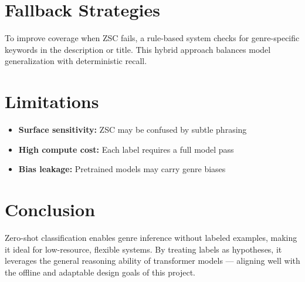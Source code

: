 \section{Fallback Strategies}
To improve coverage when ZSC fails, a rule-based system checks for genre-specific keywords in the description or title. This hybrid approach balances model generalization with deterministic recall.

\section{Limitations}
\begin{itemize}
    \item \textbf{Surface sensitivity:} ZSC may be confused by subtle phrasing
    \item \textbf{High compute cost:} Each label requires a full model pass
    \item \textbf{Bias leakage:} Pretrained models may carry genre biases
\end{itemize}

\section{Conclusion}
Zero-shot classification enables genre inference without labeled examples, making it ideal for low-resource, flexible systems. By treating labels as hypotheses, it leverages the general reasoning ability of transformer models — aligning well with the offline and adaptable design goals of this project.
